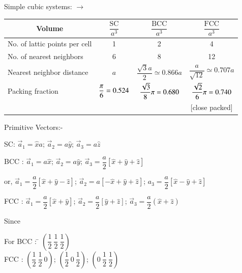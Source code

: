 Simple cubic systems: $\to$
{%
\begin{center}
\renewcommand{\arraystretch}{1.3}
\begin{tabular}{lccc}
\hline
\multicolumn{1}{c}{\bf Volume} & $\dfrac{\text{SC}}{a^{3}}$ & $\dfrac{\text{BCC}}{a^{3}}$ & $\dfrac{\text{FCC}}{a^{3}}$\\[7pt]
\hline
No. of lattic points per cell & 1 & 2 & 4\\[3pt]
No. of nearest neighbors & 6 & 8 & 12\\[5pt]
Nearest neighbor distance & $a$ & $\dfrac{\sqrt{3}a}{2}\simeq 0.866a$ & $\dfrac{a}{\sqrt{12}}\simeq 0.707a$\\[10pt]
Packing fraction & $\dfrac{\pi}{6}\newline =0.524$ & $\dfrac{\sqrt{3}}{8}\pi\newline =0.680$ & $\dfrac{\sqrt{2}}{6}\pi\newline =0.740$\\[7pt]
                 &                        & & [close packed]
\end{tabular}
\end{center}}\relax

\noindent
Primitive Vectors:-

\medskip
\noindent
SC: $\overrightarrow{a}_{1}=\widehat{x}a$; $\overrightarrow{a}_{2}=a\widehat{y}$; $\overrightarrow{a}_{3}=a\widehat{z}$

\medskip
\noindent
BCC : $\overrightarrow{a}_{1}=a\widehat{x}$; $\overrightarrow{a}_{2}=a\widehat{y}$; $\overrightarrow{a}_{3}=\dfrac{a}{2}\left[\widehat{x}+\widehat{y}+\widehat{z}\right]$

\medskip
\noindent
or, $\overrightarrow{a}_{1}=\dfrac{a}{2}\left[\widehat{x}+\widehat{y}-\widehat{z}\right]$; $\overrightarrow{a}_{2}=a\left[-\widehat{x}+\widehat{y}+\widehat{z}\right]$; $a_{3}=\dfrac{a}{2}\left[\widehat{x}-\widehat{y}+\widehat{z}\right]$

\medskip
\noindent
FCC : $\overrightarrow{a}_{1}=\dfrac{a}{2}\left[\widehat{x}+\widehat{y}\right]$; $\overrightarrow{a}_{2}=\dfrac{a}{2}\left[\widehat{y}+\widehat{z}\right]$; $\overrightarrow{a}_{3}=\dfrac{a}{2}(\widehat{x}+\widehat{z})$

\medskip
\noindent
Since \ 

\medskip

\begin{tabbing}
For BCC : \= $\left(\dfrac{1}{2} \ \dfrac{1}{2} \ \dfrac{1}{2}\right)$\\[8pt]
\phantom{For} FCC : \> $\left(\dfrac{1}{2} \ \dfrac{1}{2} \ 0\right)$; $\left(\dfrac{1}{2} \ 0 \ \dfrac{1}{2}\right)$; $\left(0 \ \dfrac{1}{2} \ \dfrac{1}{2}\right)$
\end{tabbing}

